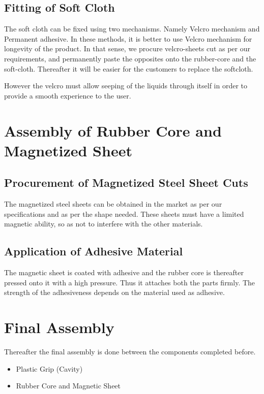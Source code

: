 \documentclass[12pt,a4paper,oneside]{article}
\begin{document}
\subsection{Fitting of Soft Cloth}

The soft cloth can be fixed using two mechanisms. Namely Velcro mechanism and Permanent adhesive. In these methods, it is better to use Velcro mechanism for longevity of the product. In that sense, we procure velcro-sheets cut as per our requirements, and permanently paste the opposites onto the rubber-core and the soft-cloth. Thereafter it will be easier for the customers to replace the softcloth. 

However the velcro must allow seeping of the liquids through itself in order to provide a smooth experience to the user.


\newpage

\section{Assembly of Rubber Core and Magnetized Sheet}

\subsection{Procurement of Magnetized Steel Sheet Cuts}
The magnetized steel sheets can be obtained in the market as per our specifications and as per the shape needed. These sheets must have a limited magnetic ability, so as not to interfere with the other materials. 

\subsection{Application of Adhesive Material}
The magnetic sheet is coated with adhesive and the rubber core is thereafter pressed onto it with a high pressure. Thus it attaches both the parts firmly. The strength of the adhesiveness depends on the material used as adhesive. 


\newpage

\section{Final Assembly}
Thereafter the final assembly is done between the components completed before.
\begin{itemize}
    \item Plastic Grip (Cavity)
    \item Rubber Core and Magnetic Sheet
\end{itemize}
\end{document}
